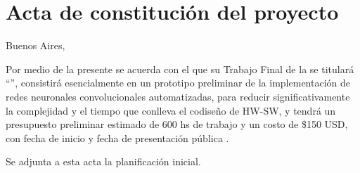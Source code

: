 \documentclass[11pt]{charter}
\begin{document}
\pagebreak

\section*{Acta de constitución del proyecto}
\label{sec:acta}

\begin{flushright}
Buenos Aires, \fechaInicioName
\end{flushright}

\vspace{2cm}

Por medio de la presente se acuerda con el \authorname\hspace{1px} que su Trabajo Final de la \degreename\hspace{1px} se titulará ``\ttitle'', consistirá esencialmente en un prototipo preliminar de la implementación de redes neuronales convolucionales automatizadas, para reducir significativamente la complejidad y el tiempo que conlleva el codiseño de HW-SW, y tendrá un presupuesto preliminar estimado de 600 hs de trabajo y un costo de \$150 USD, con fecha de inicio \fechaInicioName\hspace{1px} y fecha de presentación pública \fechaFinalName.

Se adjunta a esta acta la planificación inicial.

\vfill
\end{document}

